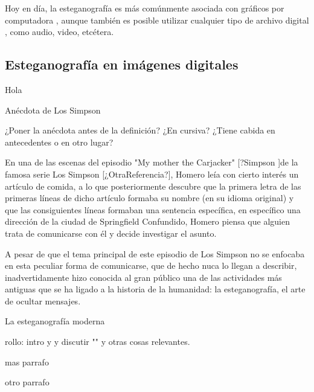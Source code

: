 Hoy en d{\'{i}}a, la esteganograf{\'{i}}a es m{\'{a}}s 
com{\'{u}}nmente asociada con gr{\'{a}}ficos por computadora 
\citet{AC_Schneier}, aunque tambi{\'{e}}n es posible utilizar 
cualquier tipo de archivo digital \citet{MP3SteganoReview}, como audio, video, etc{\'{e}}tera.

\subsection{Esteganograf{\'{i}}a en im{\'{a}}genes digitales}

Hola

An{\'{e}}cdota de Los Simpson

¿Poner la an{\'{e}}cdota antes de la definici{\'{o}}n? ¿En cursiva? ¿Tiene cabida en antecedentes o en otro lugar?

En una de las escenas del episodio "My mother the Carjacker" [?Simpson ]de la famosa serie Los Simpson [¿OtraReferencia?], Homero le{\'{i}}a con cierto inter{\'{e}}s un art{\'{i}}culo de comida, a lo que posteriormente descubre que la primera letra de las primeras l{\'{i}}neas de dicho art{\'{i}}culo formaba su nombre (en su idioma original) y que las consiguientes l{\'{i}}neas formaban una sentencia espec{\'{i}}fica, en espec{\'{i}}fico una direcci{\'{o}}n de la ciudad de Springfield Confundido, Homero piensa que alguien trata de comunicarse con {\'{e}}l y decide investigar el asunto.

A pesar de que el tema principal de este episodio de Los Simpson no se enfocaba en esta peculiar forma de comunicarse, que de hecho nuca lo llegan a describir, inadvertidamente hizo conocida al gran p{\'{u}}blico una de las actividades m{\'{a}}s antiguas que se ha ligado a la historia de la humanidad: la esteganograf{\'{i}}a, el arte de ocultar mensajes.


La esteganograf{\'{i}}a moderna 

rollo: intro y  y discutir "" y otras cosas relevantes.

mas parrafo

otro parrafo
